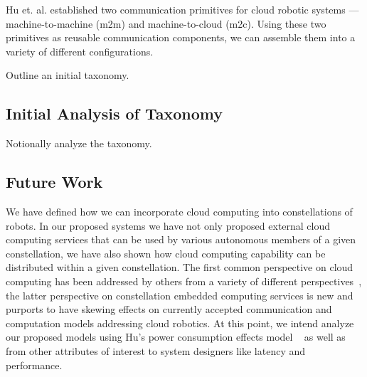 \documentclass{sig-alternate}
\begin{document}
Hu et. al. established two communication primitives for cloud robotic systems --- machine-to-machine (m2m) and machine-to-cloud (m2c).  Using these two primitives as reusable communication components, we can assemble them into a variety of different configurations.

Outline an initial taxonomy.

\subsection{Initial Analysis of Taxonomy}
Notionally analyze the taxonomy.

\subsection{Future Work}
We have defined how we can incorporate cloud computing into constellations of robots.  In our proposed systems we have not only proposed external cloud computing services that can be used by various autonomous members of a given constellation, we have also shown how cloud computing capability can be distributed within a given constellation.  The first common perspective on cloud computing has been addressed by others from a variety of different perspectives~\cite{LoSi:13,HuWeYo:12,YiZhGa:10}, the latter perspective on constellation embedded computing services is new and purports to have skewing effects on currently accepted communication and computation models addressing cloud robotics.  At this point, we intend analyze our proposed models using Hu's power consumption effects model ~\cite{HuWeYo:12} as well as from other attributes of interest to system designers like latency and performance.
\end{document}
